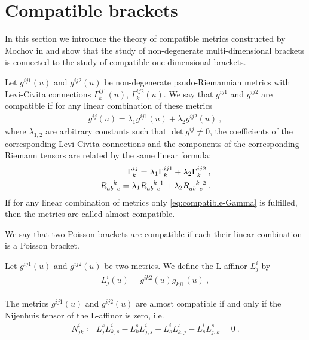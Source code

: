 \section{Compatible brackets}

In this section we introduce the theory of compatible metrics constructed by Mochov in \cite{Mochov} and show that the study of non-degenerate multi-dimensional brackets is connected to the study of compatible one-dimensional brackets. 

\begin{definition}
    Let $g^{ij1}(u)$ and $g^{ij2}(u)$ be non-degenerate psudo-Riemannian metrics with Levi-Civita connections $\Gamma^{ij1}_k(u)$, $\Gamma^{ij2}_k(u)$. We say that $g^{ij1}$ and $g^{ij2}$ are compatible if for any linear combination of these metrics
    \begin{align}
        g^{ij}(u) = \lambda_1 g^{ij1}(u) + \lambda_2 g^{ij2}(u) \:,
    \end{align}
    where $\lambda_{1,2}$ are arbitrary constants such that $\det g^{ij} \neq 0$, the coefficients of the corresponding Levi-Civita connections and the components of the corresponding Riemann tensors are related by the same linear formula:
    \begin{align}
        \Gamma^{ij}_k = \lambda_1 \Gamma^{ij1}_k + \lambda_2 \Gamma^{ij2}_k \:, \label{eq:compatible-Gamma}\\
        R\indices{_a_b^k_c} = \lambda_1 R\indices{_a_b^k_c^1} + \lambda_2 R\indices{_a_b^k_c^2} \label{eq:compatible-R}\:.
    \end{align}
    If for any linear combination of metrics only \eqref{eq:compatible-Gamma} is fulfilled, then the metrics are called almost compatible.
\end{definition}


\begin{definition}
    We say that two Poisson brackets are compatible if each their linear combination is a Poisson bracket.
\end{definition}

\begin{definition}[L-affinor]
    Let $g^{ij1}(u)$ and $g^{ij2}(u)$ be two metrics.
    We define the L-affinor $L^i_j$ by
    \begin{align}
        L^i_j(u) = g^{ik2}(u) g_{kj1}(u) \:,
    \end{align}
\end{definition}

\begin{theorem}
    The metrics $g^{ij1}(u)$ and $g^{ij2}(u)$ are almost compatible if and only if the Nijenhuis tensor of the L-affinor is zero, i.e.
    \begin{align}
        N^i_{jk} \coloneqq L^s_j L^{i}_{k,s} - L^s_k L^{i}_{j,s} - L^i_s L^s_{k,j} - L^i_s L^s_{j,k} = 0 \:.
    \end{align}
\end{theorem}

